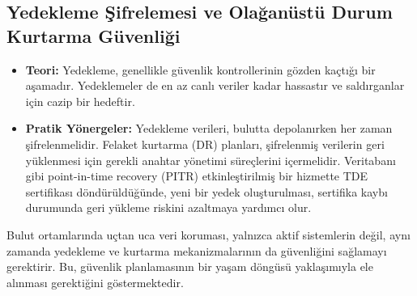 \subsection{Yedekleme Şifrelemesi ve Olağanüstü Durum Kurtarma Güvenliği}
\begin{itemize}
    \item \textbf{Teori:} Yedekleme, genellikle güvenlik kontrollerinin gözden kaçtığı bir aşamadır. Yedeklemeler de en az canlı veriler kadar hassastır ve saldırganlar için cazip bir hedeftir.
    \item \textbf{Pratik Yönergeler:} Yedekleme verileri, bulutta depolanırken her zaman şifrelenmelidir. Felaket kurtarma (DR) planları, şifrelenmiş verilerin geri yüklenmesi için gerekli anahtar yönetimi süreçlerini içermelidir. Veritabanı gibi point-in-time recovery (PITR) etkinleştirilmiş bir hizmette TDE sertifikası döndürüldüğünde, yeni bir yedek oluşturulması, sertifika kaybı durumunda geri yükleme riskini azaltmaya yardımcı olur.
\end{itemize}
Bulut ortamlarında uçtan uca veri koruması, yalnızca aktif sistemlerin değil, aynı zamanda yedekleme ve kurtarma mekanizmalarının da güvenliğini sağlamayı gerektirir. Bu, güvenlik planlamasının bir yaşam döngüsü yaklaşımıyla ele alınması gerektiğini göstermektedir.
